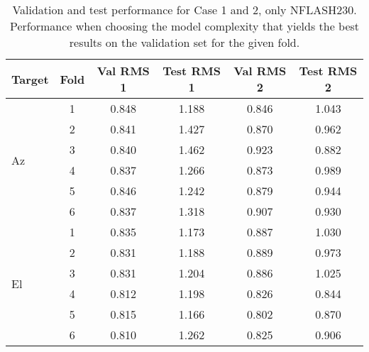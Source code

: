 \begin{table}
    \centering
    \caption{Validation and test performance for Case 1 and 2, only NFLASH230.
    Performance when choosing the model complexity that yields the best results on the validation set for the given fold.}
    \begin{tabular}{lccccc}
        \toprule
        Target & Fold & Val RMS 1 &  Test RMS 1 &  Val RMS 2 &  Test RMS 2 \\
        \midrule
        \multirow{6}{*}{Az} & 1 &  0.848 &       1.188 &      0.846 &       1.043 \\
                            & 2 &  0.841 &       1.427 &      0.870 &       0.962 \\
                            & 3 &  0.840 &       1.462 &      0.923 &       0.882 \\
                            & 4 &  0.837 &       1.266 &      0.873 &       0.989 \\
                            & 5 &  0.846 &       1.242 &      0.879 &       0.944 \\
                            & 6 &  0.837 &       1.318 &      0.907 &       0.930 \\
        \multirow{6}{*}{El} & 1 &  0.835 &       1.173 &      0.887 &       1.030 \\
                            & 2 &  0.831 &       1.188 &      0.889 &       0.973 \\
                            & 3 &  0.831 &       1.204 &      0.886 &       1.025 \\
                            & 4 &  0.812 &       1.198 &      0.826 &       0.844 \\
                            & 5 &  0.815 &       1.166 &      0.802 &       0.870 \\
                            & 6 &  0.810 &       1.262 &      0.825 &       0.906 \\
        \bottomrule
    \end{tabular}
\end{table}

